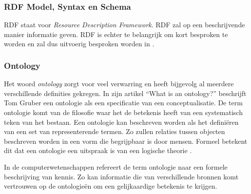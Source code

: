 \subsubsection{RDF Model, Syntax en Schema}
RDF staat voor \textit{Resource Description Framework}. RDF zal op een beschrijvende manier informatie geven. RDF is echter te belangrijk om kort besproken te worden en zal dus uitvoerig besproken worden in .

\subsubsection{Ontology}
\label{subsubsec:ontology}
Het woord \textit{ontology} zorgt voor veel verwarring en heeft bijgevolg al meerdere verschillende definities gekregen. In zijn artikel ``What is an ontology?'' beschrijft Tom Gruber een ontologie als een specificatie van een conceptualisatie. De term ontologie komt van de filosofie waar het de betekenis heeft van een systematisch teken van het bestaan. Een ontologie kan beschreven worden als het definiëren van een set van representerende termen. Zo zullen relaties tussen objecten beschreven worden in een vorm die begrijpbaar is door mensen. Formeel betekent dit dat een ontologie een uitspraak is van een logische theorie \cite{gruber2018ontology}. 

In de computerwetenschappen refereert de term ontologie naar een formele beschrijving van kennis. Zo kan informatie die van verschillende bronnen komt vertrouwen op de ontologieën om een gelijkaardige betekenis te krijgen.